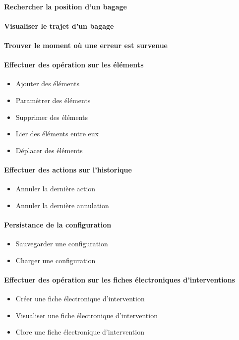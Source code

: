 {
	\paragraph{ Rechercher la position d'un bagage}
	\paragraph{ Visualiser le trajet d'un bagage}
	\paragraph{ Trouver le moment où une erreur est survenue}
}
{
\paragraph{Effectuer des opération sur les éléments }
\begin{itemize}
	\item Ajouter des éléments
	\item Paramétrer des éléments
	\item Supprimer des éléments
	\item Lier des éléments entre eux
	\item Déplacer des éléments
\end{itemize}

\paragraph{Effectuer des actions sur l'historique}
\begin{itemize}
	\item Annuler la dernière action
	\item Annuler la dernière annulation
\end{itemize}

\paragraph{Persistance de la configuration}
\begin{itemize}
	\item Sauvegarder une configuration
	\item Charger une configuration
\end{itemize}

\paragraph{Effectuer des opération sur les fiches électroniques d'interventions}
\begin{itemize}
	\item Créer une fiche électronique d'intervention
	\item Visualiser une fiche électronique d'intervention
	\item Clore une fiche électronique d'intervention
\end{itemize}

}
